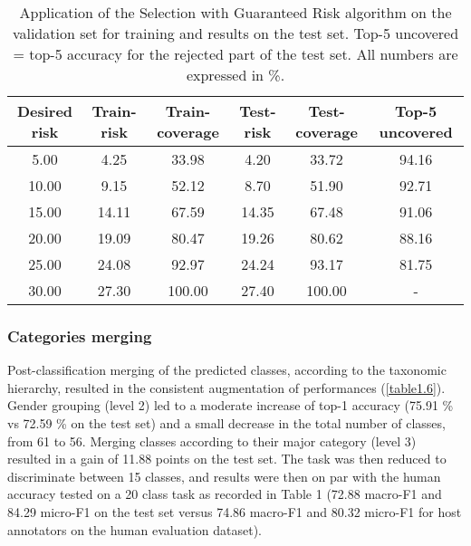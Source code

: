 \begin{table}[htbp]
  \centering
  \normalsize
  \caption[Application of the Selection with Guaranteed Risk algorithm on the validation set for training and results on the test set]{Application of the Selection with Guaranteed Risk algorithm on the validation set for training and results on the test set. Top-5 uncovered = top-5 accuracy for the rejected part of the test set. All numbers are expressed in \%.}
  \label{table1.5}
    \begin{tabular}{@{}cccccc@{}}
        \toprule
        \textbf{Desired risk} & \textbf{Train-risk} & \textbf{Train-coverage} & \textbf{Test-risk} & \textbf{Test-coverage} & \textbf{Top-5 uncovered} \\ \midrule
        5.00                  & 4.25                & 33.98                   & 4.20               & 33.72                  & 94.16                    \\
        10.00                 & 9.15                & 52.12                   & 8.70               & 51.90                  & 92.71                    \\
        15.00                 & 14.11               & 67.59                   & 14.35              & 67.48                  & 91.06                    \\
        20.00                 & 19.09               & 80.47                   & 19.26              & 80.62                  & 88.16                    \\
        25.00                 & 24.08               & 92.97                   & 24.24              & 93.17                  & 81.75                    \\
        30.00                 & 27.30               & 100.00                  & 27.40              & 100.00                 & -                        \\ \bottomrule
    \end{tabular}
\end{table}

\subsubsection{Categories merging}\label{chapitre1_6.3.2}
Post-classification merging of the predicted classes, according to the taxonomic hierarchy, resulted in the consistent augmentation of performances (\autoref{table1.6}). Gender grouping (level 2) led to a moderate increase of top-1 accuracy (75.91 \% vs 72.59 \% on the test set) and a small decrease in the total number of classes, from 61 to 56. Merging classes according to their major category (level 3) resulted in a gain of 11.88 points on the test set. The task was then reduced to discriminate between 15 classes, and results were then on par with the human accuracy tested on a 20 class task as recorded in Table 1 (72.88 macro-F1 and 84.29 micro-F1 on the test set versus 74.86 macro-F1 and 80.32 micro-F1 for host annotators on the human evaluation dataset).

